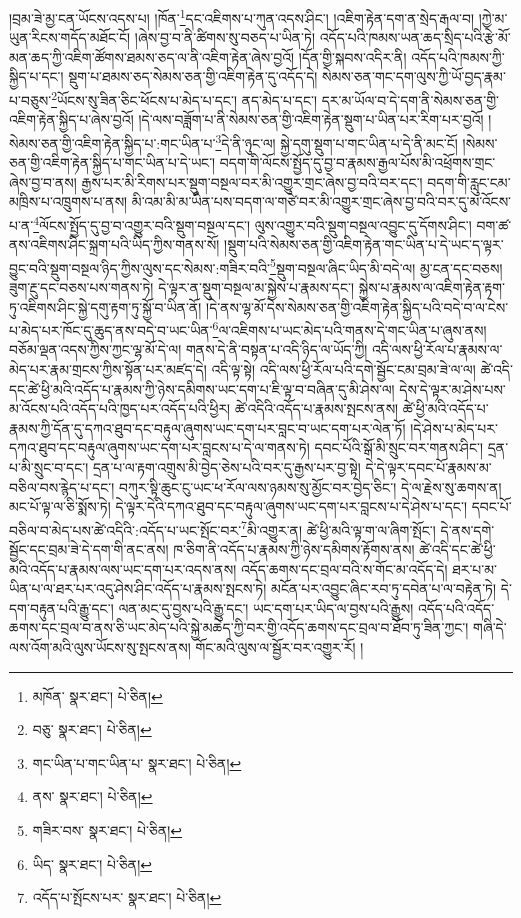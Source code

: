 །བྲམ་ཟེ་མྱ་ངན་ཡོངས་འདས་པ། །ཁོན་\footnote{མཁོན་  སྣར་ཐང་།  པེ་ཅིན། }དང་འཇིགས་པ་ཀུན་འདས་ཤིང་། །འཇིག་རྟེན་དག་ན་སྲེད་རྒལ་བ། །ཀྱེ་མ་ཡུན་རིངས་གདོད་མཐོང་ངོ། །ཞེས་བྱ་བ་ནི་ཚིགས་སུ་བཅད་པ་ཡིན་ཏེ། འདོད་པའི་ཁམས་ཡན་ཆད་སྲིད་པའི་རྩེ་མོ་མན་ཆད་ཀྱི་འཇིག་ཚོགས་ཐམས་ཅད་ལ་ནི་འཇིག་རྟེན་ཞེས་བྱའོ། །དོན་གྱི་སྐབས་འདིར་ནི། འདོད་པའི་ཁམས་ཀྱི་སྐྱིད་པ་དང་། སྡུག་པ་ཐམས་ཅད་སེམས་ཅན་གྱི་འཇིག་རྟེན་དུ་འདོད་དེ། སེམས་ཅན་གང་དག་ལུས་ཀྱི་ཡོ་བྱད་རྣམ་པ་བཅུས་\footnote{བཅུ་  སྣར་ཐང་།  པེ་ཅིན། }ཡོངས་སུ་ཟིན་ཅིང་ཕོངས་པ་མེད་པ་དང་། ནད་མེད་པ་དང་། དར་མ་ཡོལ་བ་དེ་དག་ནི་སེམས་ཅན་གྱི་འཇིག་རྟེན་སྐྱིད་པ་ཞེས་བྱའོ། །དེ་ལས་བཟློག་པ་ནི་སེམས་ཅན་གྱི་འཇིག་རྟེན་སྡུག་པ་ཡིན་པར་རིག་པར་བྱའོ། །སེམས་ཅན་གྱི་འཇིག་རྟེན་སྐྱིད་པ་:གང་ཡིན་པ་\footnote{གང་ཡིན་པ་གང་ཡིན་པ་  སྣར་ཐང་།  པེ་ཅིན། }དེ་ནི་ཉུང་ལ། སྐྱེ་དགུ་སྡུག་པ་གང་ཡིན་པ་དེ་ནི་མང་ངོ། །སེམས་ཅན་གྱི་འཇིག་རྟེན་སྐྱིད་པ་གང་ཡིན་པ་དེ་ཡང་། བདག་གི་ལོངས་སྤྱོད་དུ་བྱ་བ་རྣམས་རྒྱལ་པོས་མི་འཕྲོགས་གྲང་ཞེས་བྱ་བ་ནས། རྒྱས་པར་མི་རིགས་པར་སྡུག་བསྔལ་བར་མི་འགྱུར་གྲང་ཞེས་བྱ་བའི་བར་དང་། བདག་གི་རླུང་ངམ་མཁྲིས་པ་འཁྲུགས་པ་ནས། མི་འམ་མི་མ་ཡིན་པས་བདག་ལ་གཙེ་བར་མི་འགྱུར་གྲང་ཞེས་བྱ་བའི་བར་དུ་མ་འོངས་པ་ན་\footnote{ནས་  སྣར་ཐང་།  པེ་ཅིན། }ལོངས་སྤྱོད་དུ་བྱ་བ་འགྱུར་བའི་སྡུག་བསྔལ་དང་། ལུས་འགྱུར་བའི་སྡུག་བསྔལ་འབྱུང་དུ་དོགས་ཤིང་། བག་ཚ་ནས་འཇིགས་ཤིང་སྐྲག་པའི་ཡིད་ཀྱིས་གནས་སོ། །སྡུག་པའི་སེམས་ཅན་གྱི་འཇིག་རྟེན་གང་ཡིན་པ་དེ་ཡང་ད་ལྟར་བྱུང་བའི་སྡུག་བསྔལ་ཉིད་ཀྱིས་ལུས་དང་སེམས་:གཟིར་བའི་\footnote{གཟིར་བས་  སྣར་ཐང་།  པེ་ཅིན། }སྡུག་བསྔལ་ཞིང་ཡིད་མི་བདེ་ལ། མྱ་ངན་དང་བཅས། ཟུག་རྔུ་དང་བཅས་པས་གནས་ཏེ། དེ་ལྟར་ན་སྡུག་བསྔལ་མ་སྐྱེས་པ་རྣམས་དང་། སྐྱེས་པ་རྣམས་ལ་འཇིག་རྟེན་རྟག་ཏུ་འཇིགས་ཤིང་སྐྱེ་དགུ་རྟག་ཏུ་སྐྱོ་བ་ཡིན་ནོ། །དེ་ནས་ལྷ་མོ་དེས་སེམས་ཅན་གྱི་འཇིག་རྟེན་སྐྱིད་པའི་བདེ་བ་ལ་ངེས་པ་མེད་པར་ཁོང་དུ་ཆུད་ནས་བདེ་བ་ཡང་ཡིན་\footnote{ཡིད་  སྣར་ཐང་།  པེ་ཅིན། }ལ་འཇིགས་པ་ཡང་མེད་པའི་གནས་དེ་གང་ཡིན་པ་ཞུས་ནས། བཅོམ་ལྡན་འདས་ཀྱིས་ཀྱང་ལྷ་མོ་དེ་ལ། གནས་དེ་ནི་བསྟན་པ་འདི་ཉིད་ལ་ཡོད་ཀྱི། འདི་ལས་ཕྱི་རོལ་པ་རྣམས་ལ་མེད་པར་རྣམ་གྲངས་ཀྱིས་སྟོན་པར་མཛད་དེ། འདི་ལྟ་སྟེ། འདི་ལས་ཕྱི་རོལ་པའི་དགེ་སྦྱོང་ངམ་བྲམ་ཟེ་ལ་ལ། ཚེ་འདི་དང་ཚེ་ཕྱི་མའི་འདོད་པ་རྣམས་ཀྱི་ཉེས་དམིགས་ཡང་དག་པ་ཇི་ལྟ་བ་བཞིན་དུ་མི་ཤེས་ལ། དེས་དེ་ལྟར་མ་ཤེས་པས་མ་འོངས་པའི་འདོད་པའི་ཁྱད་པར་འདོད་པའི་ཕྱིར། ཚེ་འདིའི་འདོད་པ་རྣམས་སྤངས་ནས། ཚེ་ཕྱི་མའི་འདོད་པ་རྣམས་ཀྱི་དོན་དུ་དཀའ་ཐུབ་དང་བརྟུལ་ཞུགས་ཡང་དག་པར་བླང་བ་ཡང་དག་པར་ལེན་ཏོ། །དེ་ཤེས་པ་མེད་པར་དཀའ་ཐུབ་དང་བརྟུལ་ཞུགས་ཡང་དག་པར་བླངས་པ་དེ་ལ་གནས་ཏེ། དབང་པོའི་སྒོ་མི་སྲུང་བར་གནས་ཤིང་། དྲན་པ་མི་སྲུང་བ་དང་། དྲན་པ་ལ་རྟག་འགྲུས་མི་བྱེད་ཅེས་པའི་བར་དུ་རྒྱས་པར་བྱ་སྟེ། དེ་དེ་ལྟར་དབང་པོ་རྣམས་མ་བཅིལ་བས་རྙེད་པ་དང་། བཀུར་སྟི་ཆུང་ངུ་ཡང་ཕ་རོལ་ལས་ཉམས་སུ་མྱོང་བར་བྱེད་ཅིང་། དེ་ལ་རྗེས་སུ་ཆགས་ན། མང་པོ་ལྟ་ལ་ཅི་སྨོས་ཏེ། དེ་ལྟར་དེའི་དཀའ་ཐུབ་དང་བརྟུལ་ཞུགས་ཡང་དག་པར་བླངས་པ་དེ་ཤེས་པ་དང་། དབང་པོ་བཅིལ་བ་མེད་པས་ཚེ་འདིའི་:འདོད་པ་ཡང་སྤོང་བར་\footnote{འདོད་པ་སྤོངས་པར་  སྣར་ཐང་།  པེ་ཅིན། }མི་འགྱུར་ན། ཚེ་ཕྱི་མའི་ལྟ་ག་ལ་ཞིག་སྤོང་། དེ་ནས་དགེ་སྦྱོང་དང་བྲམ་ཟེ་དེ་དག་གི་ནང་ནས། ཁ་ཅིག་ནི་འདོད་པ་རྣམས་ཀྱི་ཉེས་དམིགས་རྟོགས་ནས། ཚེ་འདི་དང་ཚེ་ཕྱི་མའི་འདོད་པ་རྣམས་ལས་ཡང་དག་པར་འདས་ནས། འདོད་ཆགས་དང་བྲལ་བའི་ས་གོང་མ་འདོད་དེ། ཐར་པ་མ་ཡིན་པ་ལ་ཐར་པར་འདུ་ཤེས་ཤིང་འདོད་པ་རྣམས་སྤངས་ཏེ། མངོན་པར་འབྱུང་ཞིང་རབ་ཏུ་དབེན་པ་ལ་བརྟེན་ཏེ། དེ་དག་བརྟུན་པའི་རྒྱུ་དང་། ལན་མང་དུ་བྱས་པའི་རྒྱུ་དང་། ཡང་དག་པར་ཡིད་ལ་བྱས་པའི་རྒྱུས། འདོད་པའི་འདོད་ཆགས་དང་བྲལ་བ་ནས་ཅི་ཡང་མེད་པའི་སྐྱེ་མཆེད་ཀྱི་བར་གྱི་འདོད་ཆགས་དང་བྲལ་བ་ཐོབ་ཏུ་ཟིན་ཀྱང་། གཞི་དེ་ལས་འོག་མའི་ལུས་ཡོངས་སུ་སྤངས་ནས། གོང་མའི་ལུས་ལ་སྦྱོར་བར་འགྱུར་རོ། །
